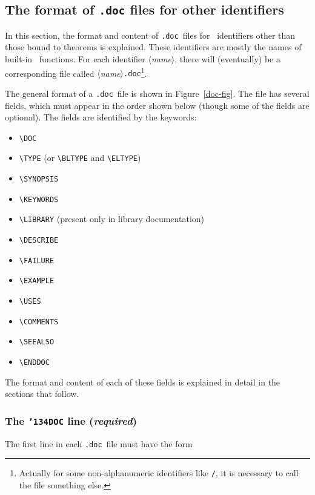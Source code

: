 \documentclass[12pt]{article}
\def\doc{{\tt .doc}}
\def\vsp{{\tt\char`\ }}
\def\meta#1{\(\langle\){\it #1}\(\rangle\)}
\begin{document}
\subsection{The format of {\tt .doc} files for other identifiers}
\label{othsec}

In this section, the format and content of \doc\ files for \ML\ identifiers
other than those bound to theorems is explained.  These identifiers are mostly
the names of built-in \ML\ functions.  For each identifier \meta{name}, there
will (eventually) be a corresponding file called \meta{name}\doc\footnote
{Actually for some non-alphanumeric identifiers like {\tt /}, it is necessary
to call the file something else.}.

The general format of a \doc\ file is shown in Figure~\ref{doc-fig}.  The file
has several fields, which must appear in the order shown below (though some of
the fields are optional). The fields are identified by the keywords:

\begin{itemize}
\item {\small\verb!\DOC!}
\item {\small\verb!\TYPE!} (or {\small\verb!\BLTYPE!} and {\small\verb!\ELTYPE!})
\item {\small\verb!\SYNOPSIS!}
\item {\small\verb!\KEYWORDS!}
\item {\small\verb!\LIBRARY!} (present only in library documentation)
\item {\small\verb!\DESCRIBE!}
\item {\small\verb!\FAILURE!}
\item {\small\verb!\EXAMPLE!}
\item {\small\verb!\USES!}
\item {\small\verb!\COMMENTS!}
\item {\small\verb!\SEEALSO!}
\item {\small\verb!\ENDDOC!}
\end{itemize}

The format and content of each of these fields is explained in detail in the
sections that follow.

\subsubsection{The {\tt {\char'134}DOC} line ({\it required})}

The first line in each \doc\ file must have the form

\medskip
\noindent\qquad{\small\verb!\DOC!\vsp\meta{name}}
\medskip
\end{document}
